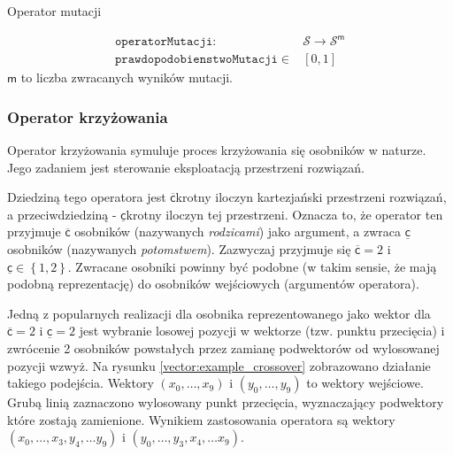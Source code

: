 \documentclass[twoside]{iisthesis}
\newcommand{\important}[1]{\mathcal{#1}}
\newcommand{\param}[1]{\mathtt{#1}}
\newcommand{\variable}[1]{\mathsf{#1}}
\newcommand{\inputVar}[1]{\variable{\overline{#1}}}
\newcommand{\outputVar}[1]{\variable{\underline{#1}}}
\begin{document}
\begin{signature}
	\caption{Operator mutacji \label{signature:mutation}}
	\begin{align}
	\param{operatorMutacji}: & \important{S} \rightarrow \important{S}^\variable{m} \\
	\param{prawdopodobienstwoMutacji} \in & [0, 1]
	\end{align}
	$\variable{m}$ to liczba zwracanych wyników mutacji.
\end{signature}	

\subsubsection{Operator krzyżowania} \label{subsection:crossover}

Operator krzyżowania symuluje proces krzyżowania się osobników w naturze. Jego zadaniem jest sterowanie eksploatacją przestrzeni rozwiązań.

Dziedziną tego operatora jest $\inputVar{c}$krotny iloczyn kartezjański przestrzeni rozwiązań, a przeciwdziedziną - $\outputVar{c}$krotny iloczyn tej przestrzeni. Oznacza to, że operator ten przyjmuje $\inputVar{c}$ osobników (nazywanych \emph{rodzicami}) jako argument, a zwraca $\outputVar{c}$ osobników (nazywanych \emph{potomstwem}). Zazwyczaj przyjmuje się $ \inputVar{c} = 2 $ i $\outputVar{c} \in \left\{1, 2 \right\}$. Zwracane osobniki powinny być podobne (w takim sensie, że mają podobną reprezentację) do osobników wejściowych (argumentów operatora). 

Jedną z popularnych realizacji dla osobnika reprezentowanego jako wektor dla $\inputVar{c} = 2$ i $\outputVar{c} = 2$ jest wybranie losowej pozycji w wektorze (tzw. punktu przecięcia) i zwrócenie 2 osobników powstałych przez zamianę podwektorów od wylosowanej pozycji wzwyż. Na rysunku \ref{vector:example_crossover} zobrazowano działanie takiego podejścia. Wektory $(x_0, \ldots, x_9)$ i $(y_0, \ldots, y_9)$ to wektory wejściowe. Grubą linią zaznaczono wylosowany punkt przecięcia, wyznaczający podwektory które zostają zamienione. Wynikiem zastosowania operatora są wektory $(x_0, \ldots, x_3, y_4, \ldots y_9)$ i $(y_0, \ldots, y_3, x_4, \ldots x_9)$.
\end{document}

